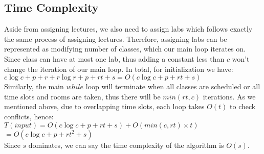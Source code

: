 \documentclass[11pt, oneside]{article}   	%
\begin{document}
\subsection{Time Complexity}
Aside from assigning lectures, we also need to assign labs which follows exactly the same process of assigning lectures. Therefore, assigning labs can be represented as modifying number of classes, which our main loop iterates on. Since class can have at most one lab, thus adding a constant less than $c$ won't change the iteration of our main loop. In total, for initialization we have: 
\\\hspace*{30mm}$c\log c + p + r + r\log r+ p + rt + s = O(c\log c + p + rt + s)$
\\Similarly, the main $while$ loop will terminate when all classes are scheduled or all time slots and rooms are taken, thus there will be $min(rt, c)$ iterations. As we mentioned above, due to overlapping time slots, each loop takes $O(t)$ to check conflicts, hence:
\\\hspace*{30mm}$T(input) =  O(c\log c + p + rt + s) + O(min(c, rt)\times t)$
\\\hspace*{46mm}$=O(c\log c + p + rt^2 + s)$\\
Since $s$ dominates, we can say the time complexity of the algorithm is $O(s)$.
\end{document}
